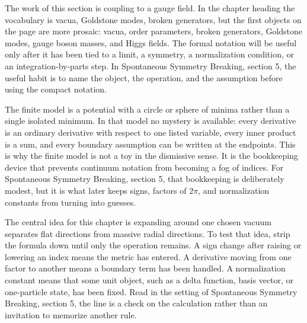 











The work of this section is coupling to a gauge field.  In the chapter heading the vocabulary is vacua, Goldstone modes, broken generators, but the first objects on the page are more prosaic: vacua, order parameters, broken generators, Goldstone modes, gauge boson masses, and Higgs fields.  The formal notation will be useful only after it has been tied to a limit, a symmetry, a normalization condition, or an integration-by-parts step.  In Spontaneous Symmetry Breaking, section 5, the useful habit is to name the object, the operation, and the assumption before using the compact notation.

The finite model is a potential with a circle or sphere of minima rather than a single isolated minimum.  In that model no mystery is available: every derivative is an ordinary derivative with respect to one listed variable, every inner product is a sum, and every boundary assumption can be written at the endpoints.  This is why the finite model is not a toy in the dismissive sense.  It is the bookkeeping device that prevents continuum notation from becoming a fog of indices.  For Spontaneous Symmetry Breaking, section 5, that bookkeeping is deliberately modest, but it is what later keeps signs, factors of \(2\pi\), and normalization constants from turning into guesses.

The central idea for this chapter is expanding around one chosen vacuum separates flat directions from massive radial directions.  To test that idea, strip the formula down until only the operation remains.  A sign change after raising or lowering an index means the metric has entered.  A derivative moving from one factor to another means a boundary term has been handled.  A normalization constant means that some unit object, such as a delta function, basis vector, or one-particle state, has been fixed.  Read in the setting of Spontaneous Symmetry Breaking, section 5, the line is a check on the calculation rather than an invitation to memorize another rule.

